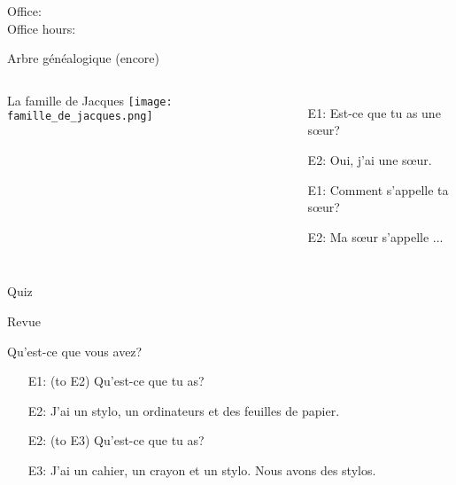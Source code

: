 \documentclass{beamer}
\subtitle[Le verb \lexi{avoir}]{Le verb \lexi{avoir}}
\begin{document}
  \begin{frame}
    \titlepage
    \tiny{Office: \\
          Office hours: }
  \end{frame}

  \begin{frame}{Arbre généalogique (encore) }
    \begin{columns}[t]
        La famille de Jacques
        \texttt{[image: famille\_de\_jacques.png]}
        \begin{itemize}
          \item[E1:] Est-ce que tu as une sœur?
          \item[E2:] Oui, j'ai une sœur.
          \item[E1:] Comment s'appelle ta sœur?
          \item[E2:] Ma sœur s'appelle ...
        \end{itemize}
    \end{columns}
  \end{frame}

  \begin{frame}{}
    \begin{center}
      \Large Quiz
    \end{center}
  \end{frame}

  \begin{frame}{Revue }
    \begin{center}
      
    \end{center}
  \end{frame}

  \begin{frame}{Qu'est-ce que vous avez? }
    \begin{itemize}
      \item[E1:] (to E2) Qu'est-ce que tu as?
      \item[E2:] J'ai un \alert{stylo}, un ordinateurs et des feuilles de papier.
      \item[E2:] (to E3) Qu'est-ce que tu as?
      \item[E3:] J'ai un cahier, un crayon et un \alert{stylo}. Nous avons \alert{des stylos}.
    \end{itemize}
  \end{frame}
\end{document}
